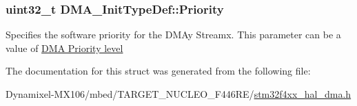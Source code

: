 \subsubsection[{\texorpdfstring{Priority}{Priority}}]{\setlength{\rightskip}{0pt plus 5cm}uint32\+\_\+t D\+M\+A\+\_\+\+Init\+Type\+Def\+::\+Priority}\hypertarget{struct_d_m_a___init_type_def_af110cc02c840207930e3c0e5de5d7dc4}{}\label{struct_d_m_a___init_type_def_af110cc02c840207930e3c0e5de5d7dc4}
Specifies the software priority for the D\+M\+Ay Streamx. This parameter can be a value of \hyperlink{group___d_m_a___priority__level}{D\+MA Priority level} 

The documentation for this struct was generated from the following file\+:\begin{DoxyCompactItemize}
\item 
Dynamixel-\/\+M\+X106/mbed/\+T\+A\+R\+G\+E\+T\+\_\+\+N\+U\+C\+L\+E\+O\+\_\+\+F446\+R\+E/\hyperlink{stm32f4xx__hal__dma_8h}{stm32f4xx\+\_\+hal\+\_\+dma.\+h}\end{DoxyCompactItemize}
